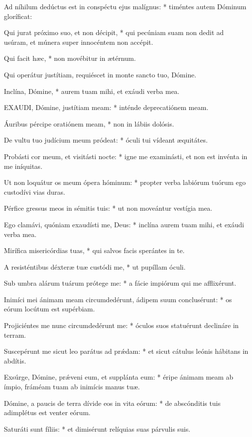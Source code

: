 Ad níhilum dedúctus est in conspéctu ejus malígnus: * timéntes autem Dóminum gloríficat:

Qui jurat próximo suo, et non décipit, * qui pecúniam suam non dedit ad usúram, et múnera super innocéntem non accépit.

Qui facit hæc, * non movébitur in ætérnum.

 Qui operátur justítiam, requiéscet in monte sancto tuo, Dómine.

 Inclína, Dómine, * aurem tuam mihi, et exáudi verba mea.


\lettrine[lines=2]{E}{XAUDI}, Dómine, justítiam meam: * inténde deprecatiónem meam.

Áuribus pércipe oratiónem meam, * non in lábiis dolósis.

De vultu tuo judícium meum pródeat: * óculi tui vídeant æquitátes.

Probásti cor meum, et visitásti nocte: * igne me examinásti, et non est invénta in me iníquitas.

Ut non loquátur os meum ópera hóminum: * propter verba labiórum tuórum ego custodívi vias duras.

Pérfice gressus meos in sémitis tuis: * ut non moveántur vestígia mea.

Ego clamávi, quóniam exaudísti me, Deus: * inclína aurem tuam mihi, et exáudi verba mea.

Mirífica misericórdias tuas, * qui salvos facis sperántes in te.

A resisténtibus déxteræ tuæ custódi me, * ut pupíllam óculi.

Sub umbra alárum tuárum prótege me: * a fácie impiórum qui me afflixérunt.

Inimíci mei ánimam meam circumdedérunt, ádipem suum conclusérunt: * os eórum locútum est supérbiam.

Projiciéntes me nunc circumdedérunt me: * óculos suos statuérunt declináre in terram.

Suscepérunt me sicut leo parátus ad prǽdam: * et sicut cátulus leónis hábitans in abdítis.

Exsúrge, Dómine, prǽveni eum, et supplánta eum: * éripe ánimam meam ab ímpio, fráméam tuam ab inimícis manus tuæ.

Dómine, a paucis de terra dívide eos in vita eórum: * de abscónditis tuis adimplétus est venter eórum.

Saturáti sunt fíliis: * et dimisérunt relíquias suas párvulis suis.

